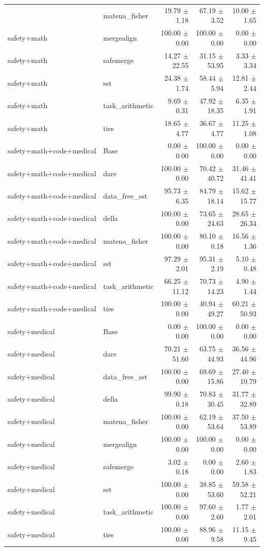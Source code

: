 \begin{table}[H]
{\begin{tabular}{llrrr}
{safety+math & matena\_fisher & 19.79 $\pm$ 1.18 & 67.19 $\pm$ 3.52 & 10.00 $\pm$ 1.65 \\
safety+math & mergealign & 100.00 $\pm$ 0.00 & 100.00 $\pm$ 0.00 & 0.00 $\pm$ 0.00 \\
safety+math & safemerge & 14.27 $\pm$ 22.55 & 31.15 $\pm$ 53.95 & 3.33 $\pm$ 3.34 \\
safety+math & sst & 24.38 $\pm$ 1.74 & 58.44 $\pm$ 5.94 & 12.81 $\pm$ 2.44 \\
safety+math & task\_arithmetic & 9.69 $\pm$ 0.31 & 47.92 $\pm$ 18.35 & 6.35 $\pm$ 1.91 \\
safety+math & ties & 18.65 $\pm$ 4.77 & 36.67 $\pm$ 4.77 & 11.25 $\pm$ 1.08 \\
safety+math+code+medical & Base & 0.00 $\pm$ 0.00 & 100.00 $\pm$ 0.00 & 0.00 $\pm$ 0.00 \\
safety+math+code+medical & dare & 100.00 $\pm$ 0.00 & 70.42 $\pm$ 40.72 & 31.46 $\pm$ 41.41 \\
safety+math+code+medical & data\_free\_sst & 95.73 $\pm$ 6.35 & 84.79 $\pm$ 18.14 & 15.62 $\pm$ 15.77 \\
safety+math+code+medical & della & 100.00 $\pm$ 0.00 & 73.65 $\pm$ 24.63 & 28.65 $\pm$ 26.34 \\
safety+math+code+medical & matena\_fisher & 100.00 $\pm$ 0.00 & 80.10 $\pm$ 0.18 & 16.56 $\pm$ 1.36 \\
safety+math+code+medical & sst & 97.29 $\pm$ 2.01 & 95.31 $\pm$ 2.19 & 5.10 $\pm$ 0.48 \\
safety+math+code+medical & task\_arithmetic & 66.25 $\pm$ 11.12 & 70.73 $\pm$ 14.23 & 4.90 $\pm$ 1.44 \\
safety+math+code+medical & ties & 100.00 $\pm$ 0.00 & 40.94 $\pm$ 49.27 & 60.21 $\pm$ 50.93 \\
safety+medical & Base & 0.00 $\pm$ 0.00 & 100.00 $\pm$ 0.00 & 0.00 $\pm$ 0.00 \\
safety+medical & dare & 70.21 $\pm$ 51.60 & 63.75 $\pm$ 44.93 & 36.56 $\pm$ 44.96 \\
safety+medical & data\_free\_sst & 100.00 $\pm$ 0.00 & 69.69 $\pm$ 15.86 & 27.40 $\pm$ 10.79 \\
safety+medical & della & 99.90 $\pm$ 0.18 & 70.83 $\pm$ 30.45 & 31.77 $\pm$ 32.89 \\
safety+medical & matena\_fisher & 100.00 $\pm$ 0.00 & 62.19 $\pm$ 53.64 & 37.50 $\pm$ 53.89 \\
safety+medical & mergealign & 100.00 $\pm$ 0.00 & 100.00 $\pm$ 0.00 & 0.00 $\pm$ 0.00 \\
safety+medical & safemerge & 3.02 $\pm$ 0.18 & 0.00 $\pm$ 0.00 & 2.60 $\pm$ 1.83 \\
safety+medical & sst & 100.00 $\pm$ 0.00 & 38.85 $\pm$ 53.60 & 59.58 $\pm$ 52.21 \\
safety+medical & task\_arithmetic & 100.00 $\pm$ 0.00 & 97.60 $\pm$ 2.60 & 1.77 $\pm$ 2.01 \\
safety+medical & ties & 100.00 $\pm$ 0.00 & 88.96 $\pm$ 9.58 & 11.15 $\pm$ 9.45 \\
\bottomrule
\end{tabular}
}
\end{table}


